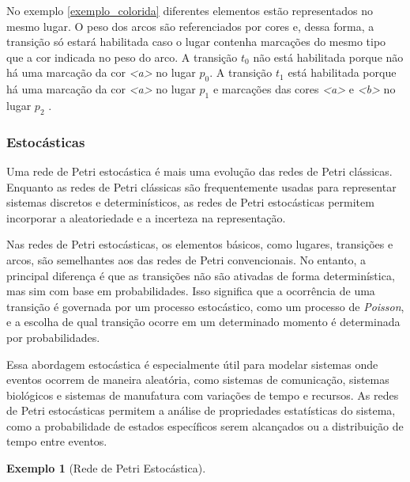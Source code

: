 \documentclass[
	12pt,				%
	openright,			%
	oneside,			%
	a4paper,			%
	english,			%
	brazil				%
	]{abntex2}
\newtheorem{exemplo}{Exemplo}
\begin{document}
No exemplo \ref{exemplo_colorida} diferentes elementos estão representados no mesmo lugar.  O peso dos arcos são referenciados por cores e, dessa forma, a transição só estará habilitada caso o lugar contenha marcações do mesmo tipo que a cor indicada no peso do arco. A transição $t_{0}$ não está habilitada porque não há uma marcação da cor \textit{<a>} no lugar $p_{0}$. A transição $t_{1}$ está habilitada porque há uma marcação da cor \textit{<a>} no lugar $p_{1}$ e marcações das cores \textit{<a>} e \textit{<b>} no lugar $p_{2}$ \cite{inbook}.

\subsubsection*{Estocásticas} \label{cap:redeEstocastica}

Uma rede de Petri estocástica é mais uma evolução das redes de Petri clássicas. Enquanto as redes de Petri clássicas são frequentemente usadas para representar sistemas discretos e determinísticos, as redes de Petri estocásticas permitem incorporar a aleatoriedade e a incerteza na representação.

Nas redes de Petri estocásticas, os elementos básicos, como lugares, transições e arcos, são semelhantes aos das redes de Petri convencionais. No entanto, a principal diferença é que as transições não são ativadas de forma determinística, mas sim com base em probabilidades. Isso significa que a ocorrência de uma transição é governada por um processo estocástico, como um processo de \textit{Poisson}, e a escolha de qual transição ocorre em um determinado momento é determinada por probabilidades.

Essa abordagem estocástica é especialmente útil para modelar sistemas onde eventos ocorrem de maneira aleatória, como sistemas de comunicação, sistemas biológicos e sistemas de manufatura com variações de tempo e recursos. As redes de Petri estocásticas permitem a análise de propriedades estatísticas do sistema, como a probabilidade de estados específicos serem alcançados ou a distribuição de tempo entre eventos.

\newpage
\begin{exemplo} [Rede de Petri Estocástica]
\label{exemplo_estocastica}
\end{exemplo}
\end{document}
